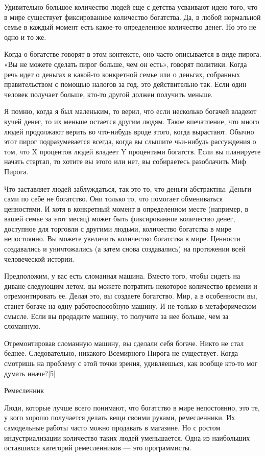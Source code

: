 \documentclass[ebook,12pt,oneside,openany]{memoir}
\begin{document}
Удивительно большое количество людей еще с детства усваивают идею
того, что в мире существует фиксированное количество богатства. Да, в
любой нормальной семье в каждый момент есть какое-то определенное
количество денег. Но это не одно и то же.

Когда о богатстве говорят в этом контексте, оно часто описывается в
виде пирога. «Вы не можете сделать пирог больше, чем он есть», говорят
политики. Когда речь идет о деньгах в какой-то конкретной семье или о
деньгах, собранных правительством с помощью налогов за год, это
действительно так. Если один человек получает больше, кто-то другой
должен получить меньше.

Я помню, когда я был маленьким, то верил, что если несколько богачей
владеют кучей денег, то их меньше остается другим людям. Такое
впечатление, что много людей продолжают верить во что-нибудь вроде
этого, когда вырастают. Обычно этот пирог подразумевается всегда,
когда вы слышите чьи-нибудь рассуждения о том, что X процентов людей
владеет Y процентами богатств. Если вы планируете начать стартап, то
хотите вы этого или нет, вы собираетесь разоблачить Миф Пирога.

Что заставляет людей заблуждаться, так это то, что деньги абстрактны.
Деньги сами по себе не богатство. Они только то, что помогает
обмениваться ценностями. И хотя в конкретный момент в определенном
месте (например, в вашей семье за этот месяц) может быть фиксированное
количество денег, доступное для торговли с другими людьми, количество
богатства в мире непостоянно. Вы можете увеличить количество богатства
в мире. Ценности создавались и уничтожались (а затем снова
создавались) на протяжении всей человеческой истории.

Предположим, у вас есть сломанная машина. Вместо того, чтобы сидеть на
диване следующим летом, вы можете потратить некоторое количество
времени и отремонтировать ее. Делая это, вы создаете богатство. Мир, а
в особенности вы, станет богаче на одну работоспособную машину. И не
только в метафорическом смысле. Если вы продадите машину, то получите
за нее больше, чем за сломанную.

Отремонтировав сломанную машину, вы сделали себя богаче. Никто не стал
беднее. Следовательно, никакого Всемирного Пирога не существует. Когда
смотришь на проблему с этой точки зрения, удивляешься, как вообще
кто-то мог думать иначе?[5]

Ремесленник

Люди, которые лучше всего понимают, что богатство в мире непостоянно,
это те, у кого хорошо получается делать вещи своими руками,
ремесленники. Их самодельные работы часто можно продавать в магазине.
Но с ростом индустриализации количество таких людей уменьшается. Одна
из наибольших оставшихся категорий ремесленников — это программисты.
\end{document}
